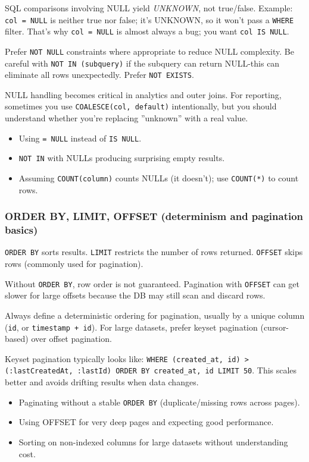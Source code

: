 \M SQL comparisons involving NULL yield \textit{UNKNOWN}, not true/false. Example: 
\texttt{col = NULL} is neither true nor false; it's UNKNOWN, so it won't pass a \texttt{WHERE} 
filter. That's why \texttt{col = NULL} is almost always a bug; you want \texttt{col IS NULL}.

\Sx Prefer \texttt{NOT NULL} constraints where appropriate to reduce NULL complexity. Be careful 
with \texttt{NOT IN (subquery)} if the subquery can return NULL-this can eliminate all rows 
unexpectedly. Prefer \texttt{NOT EXISTS}.

\E NULL handling becomes critical in analytics and outer joins. For reporting, sometimes you use 
\texttt{COALESCE(col, default)} intentionally, but you should understand whether you're replacing 
''unknown'' with a real value.

\Pitfall
\begin{itemize}
  \item Using \texttt{= NULL} instead of \texttt{IS NULL}.
  \item \texttt{NOT IN} with NULLs producing surprising empty results.
  \item Assuming \texttt{COUNT(column)} counts NULLs (it doesn't); use \texttt{COUNT(*)} 
  to count rows.
\end{itemize}

\subsubsection{ORDER BY, LIMIT, OFFSET (determinism and pagination basics)}
\J \texttt{ORDER BY} sorts results. \texttt{LIMIT} restricts the number of rows returned. 
\texttt{OFFSET} skips rows (commonly used for pagination).

\M Without \texttt{ORDER BY}, row order is not guaranteed. Pagination with \texttt{OFFSET} 
can get slower for large offsets because the DB may still scan and discard rows.

\Sx Always define a deterministic ordering for pagination, usually by a unique column 
(\texttt{id}, or \texttt{timestamp + id}). For large datasets, prefer keyset pagination 
(cursor-based) over offset pagination.

\E Keyset pagination typically looks like: \texttt{WHERE (created\_at, id) > 
(:lastCreatedAt, :lastId) ORDER BY created\_at, id LIMIT 50}. This scales better and avoids 
drifting results when data changes.

\newpage
\Pitfall
\begin{itemize}
  \item Paginating without a stable \texttt{ORDER BY} (duplicate/missing rows across pages).
  \item Using OFFSET for very deep pages and expecting good performance.
  \item Sorting on non-indexed columns for large datasets without understanding cost.
\end{itemize}